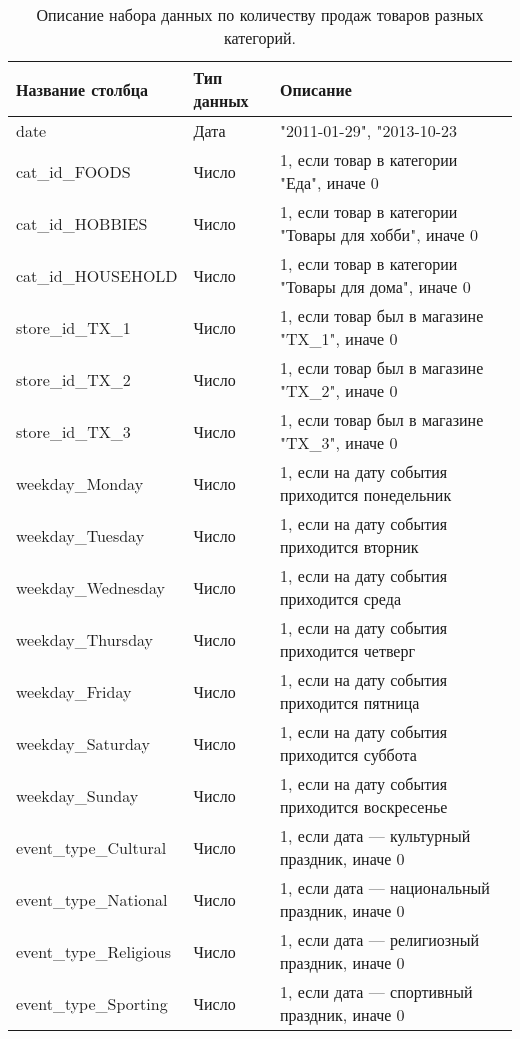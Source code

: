 \begin{table}
    \centering
    \begin{tabular}{|l|l||l|}
		\hline
			Название столбца	& Тип данных				& Описание \\
		\hline
			date				& Дата 			& "2011-01-29", "2013-10-23			\\
			cat\_id\_FOODS		& Число			& 1, если товар в категории "Еда", иначе 0 \\
			cat\_id\_HOBBIES		& Число		& 1, если товар в категории "Товары для хобби", иначе 0 \\
			cat\_id\_HOUSEHOLD	& Число			& 1, если товар в категории "Товары для дома", иначе 0 \\
			store\_id\_TX\_1		& Число		& 1, если товар был в магазине "TX\_1", иначе 0  \\
			store\_id\_TX\_2		& Число		& 1, если товар был в магазине "TX\_2", иначе 0  \\
			store\_id\_TX\_3		& Число		& 1, если товар был в магазине "TX\_3", иначе 0  \\
			weekday\_Monday			& Число  	& 1, если на дату события приходится понедельник		\\
			weekday\_Tuesday		& Число  	& 1, если на дату события приходится вторник		\\
			weekday\_Wednesday		& Число  	& 1, если на дату события приходится среда		\\
			weekday\_Thursday		& Число  	& 1, если на дату события приходится четверг		\\
			weekday\_Friday			& Число  	& 1, если на дату события приходится пятница		\\
			weekday\_Saturday		& Число  	& 1, если на дату события приходится суббота		\\
			weekday\_Sunday			& Число  	& 1, если на дату события приходится воскресенье	\\
			event\_type\_Cultural	& Число 	& 1, если дата --- культурный  праздник, иначе 0 \\
			event\_type\_National	& Число 	& 1, если дата --- национальный  праздник, иначе 0 \\
			event\_type\_Religious	& Число 	& 1, если дата --- религиозный  праздник, иначе 0 \\
			event\_type\_Sporting	& Число 	& 1, если дата --- спортивный праздник, иначе 0 \\
		\hline
	\end{tabular}
	\caption{ Описание набора данных по количеству продаж товаров разных категорий. }
	\label{tbl:sales_dataset_description}
\end{table}


